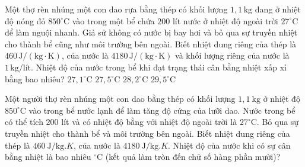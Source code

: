 \begin{ex}
Một thợ rèn nhúng một con dao rựa bằng thép có khối lượng $1,1\,\mathrm{kg}$ đang ở nhiệt độ nóng đỏ $850^\circ\mathrm{C}$ vào trong một bể chứa $200$ lít nước ở nhiệt độ ngoài trời $27^\circ\mathrm{C}$ để làm nguội nhanh. Giả sử không có nước bị bay hơi và bỏ qua sự truyền nhiệt cho thành bể cũng như môi trường bên ngoài. Biết nhiệt dung riêng của thép là $460\,\mathrm{J/(kg\cdot K)}$, của nước là $4180\,\mathrm{J/(kg\cdot K)}$ và khối lượng riêng của nước là $1\,\mathrm{kg/lít}$. Nhiệt độ của nước trong bể khi đạt trạng thái cân bằng nhiệt xấp xỉ bằng bao nhiêu?
\choice
{$27,1^\circ\mathrm{C}$}
{\True $27,5^\circ\mathrm{C}$}
{$28,2^\circ\mathrm{C}$}
{$29,5^\circ\mathrm{C}$}
\end{ex}

\begin{ex}
Một người thợ rèn nhúng một con dao bằng thép có khối lượng $1,1\ \mathrm{kg}$ ở nhiệt độ $850^\circ \mathrm{C}$ vào trong bể nước lạnh để làm tăng độ cứng của lưỡi dao. Nước trong bể có thể tích $200$ lít và có nhiệt độ bằng với nhiệt độ ngoài trời là $27^\circ \mathrm{C}$. Bỏ qua sự truyền nhiệt cho thành bể và môi trường bên ngoài. Biết nhiệt dung riêng của thép là $460\ \mathrm{J/kg}.K$, của nước là $4180\ \mathrm{J/kg}.K$. Nhiệt độ của nước khi có sự cân bằng nhiệt là bao nhiêu $^\circ \mathrm{C}$ (kết quả làm tròn đến chữ số hàng phần mười)?
\end{ex}

